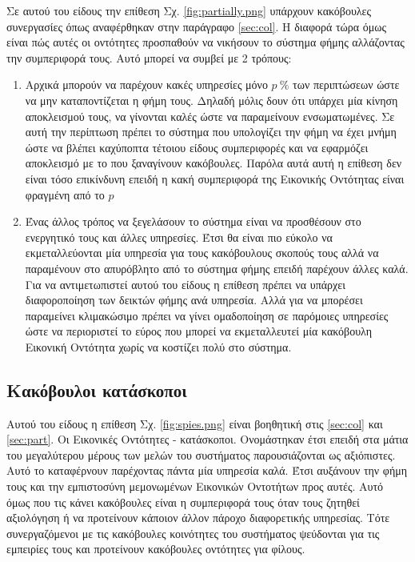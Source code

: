 Σε αυτού του είδους την επίθεση Σχ. \ref{fig:partially.png} υπάρχουν κακόβουλες συνεργασίες όπως αναφέρθηκαν στην παράγραφο \ref{sec:col}. Η διαφορά τώρα όμως είναι πώς αυτές οι οντότητες προσπαθούν να νικήσουν το σύστημα φήμης αλλάζοντας την συμπεριφορά τους. Αυτό μπορεί να συμβεί με 2 τρόπους: 
\begin{enumerate}

\item Αρχικά μπορούν να παρέχουν κακές υπηρεσίες μόνο $ p \ \%  $ των περιπτώσεων ώστε να μην καταποντίζεται η φήμη τους. Δηλαδή μόλις δουν ότι υπάρχει μία κίνηση αποκλεισμού τους, να γίνονται καλές ώστε να παραμείνουν ενσωματωμένες. Σε αυτή την περίπτωση πρέπει το σύστημα που υπολογίζει την φήμη να έχει μνήμη ώστε να βλέπει καχύποπτα τέτοιου είδους συμπεριφορές και να εφαρμόζει αποκλεισμό με το που ξαναγίνουν κακόβουλες. Παρόλα αυτά αυτή η επίθεση δεν είναι τόσο επικίνδυνη επειδή η κακή συμπεριφορά της Εικονικής Οντότητας είναι φραγμένη από το $p$

\item Ένας άλλος τρόπος να ξεγελάσουν το σύστημα είναι να προσθέσουν στο ενεργητικό τους και άλλες υπηρεσίες. Έτσι θα είναι πιο εύκολο να εκμεταλλεύονται μία υπηρεσία για τους κακόβουλους σκοπούς τους αλλά να παραμένουν στο απυρόβλητο από το σύστημα φήμης επειδή παρέχουν άλλες καλά. Για να αντιμετωπιστεί αυτού του είδους η επίθεση πρέπει να υπάρχει διαφοροποίηση των δεικτών φήμης ανά υπηρεσία. Αλλά για να μπορέσει παραμείνει κλιμακώσιμο πρέπει να γίνει ομαδοποίηση σε παρόμοιες υπηρεσίες ώστε να περιοριστεί το εύρος που μπορεί να εκμεταλλευτεί μία κακόβουλη Εικονική Οντότητα χωρίς να κοστίζει πολύ στο σύστημα.
\end{enumerate}

\newpage
\subsection{Κακόβουλοι κατάσκοποι}\label{sec:spies}

Αυτού του είδους η επίθεση  Σχ. \ref{fig:spies.png} είναι βοηθητική στις \ref{sec:col} και \ref{sec:part}. Οι Εικονικές Οντότητες - κατάσκοποι. Ονομάστηκαν έτσι επειδή στα μάτια του μεγαλύτερου μέρους των μελών του συστήματος παρουσιάζονται ως αξιόπιστες. Αυτό το καταφέρνουν παρέχοντας πάντα μία υπηρεσία καλά. Έτσι αυξάνουν την φήμη τους και την εμπιστοσύνη μεμονωμένων Εικονικών Οντοτήτων προς αυτές. Αυτό όμως που τις κάνει κακόβουλες είναι η συμπεριφορά τους όταν τους ζητηθεί αξιολόγηση ή να προτείνουν κάποιον άλλον πάροχο διαφορετικής υπηρεσίας. Τότε συνεργαζόμενοι με τις κακόβουλες κοινότητες του συστήματος ψεύδονται για τις εμπειρίες τους και προτείνουν κακόβουλες οντότητες για φίλους.

